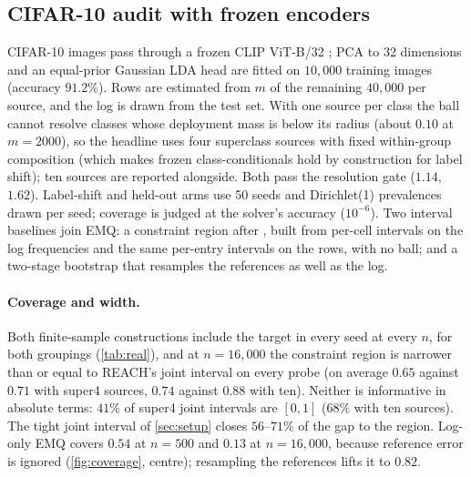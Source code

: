 \subsection{CIFAR-10 audit with frozen encoders}
\label{sec:exp-real}

CIFAR-10 images \citep{krizhevsky2009learning} pass through a frozen CLIP ViT-B/32
\citep{radford2021clip}; PCA to 32 dimensions and an
equal-prior Gaussian LDA head are fitted on $10{,}000$ training images (accuracy $91.2\%$). Rows are
estimated from $m$ of the remaining $40{,}000$ per source, and the log is drawn from the test set. With
one source per class the ball cannot resolve classes whose deployment mass is below its radius (about
$0.10$ at $m=2000$), so the headline uses four superclass sources with fixed within-group composition
(which makes frozen class-conditionals hold by construction for label shift); ten sources are reported
alongside. Both pass the resolution gate ($1.14$, $1.62$). Label-shift and held-out arms use 50 seeds
and Dirichlet(1) prevalences drawn per seed; coverage is judged at the solver's accuracy ($10^{-6}$).
Two interval baselines join EMQ: a constraint region after \citet{li2026matrix}, built from per-cell
intervals on the log frequencies and the same per-entry intervals on the rows, with no ball; and a
two-stage bootstrap that resamples the references as well as the log.

\begin{table}[t]
\centering\small
\caption{CIFAR-10 label shift, CLIP, $n=16{,}000$, $m=2000$, 50 seeds: per-probe inclusion of the true
posterior (column ``coverage'') and mean width on known-class cells.}
\label{tab:real}
\setlength{\tabcolsep}{4pt}
\resizebox{\columnwidth}{!}{}
\end{table}

\paragraph{Coverage and width.} Both finite-sample constructions include the target in every seed at every
$n$, for both groupings (\cref{tab:real}), and at $n=16{,}000$ the constraint region is narrower than or
equal to REACH's joint interval on every probe (on average $0.65$ against $0.71$ with super4 sources, $0.74$
against $0.88$ with ten). Neither is informative in absolute terms: $41\%$ of super4 joint intervals are
$[0,1]$ ($68\%$ with ten sources). The tight joint interval of \cref{sec:setup} closes $56$--$71\%$ of the gap
to the region. Log-only EMQ covers $0.54$ at $n=500$ and $0.13$ at $n=16{,}000$, because reference error is
ignored (\cref{fig:coverage}, centre); resampling the references lifts it to $0.82$.

